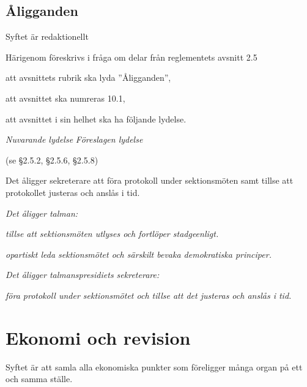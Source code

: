 \documentclass{article}
\newenvironment{lydelse}
    {\begin{paracol}{2}%
        \emph{Nuvarande lydelse}%
        \switchcolumn%
        \emph{Föreslagen lydelse}%
    \end{paracol}%
    \begin{enumerate}[label=\thesubsection.\arabic*]%
    \begin{paracol}{2}%
    }{\end{paracol}\end{enumerate}}
\begin{document}
\subsection{Åligganden}
Syftet är redaktionellt

Härigenom föreskrivs i fråga om delar från reglementets avsnitt 2.5

\begin{dels}
    \item att avsnittets rubrik ska lyda ''Åligganden'',
    \item att avsnittet ska numreras 10.1,
    \item att avsnittet i sin helhet ska ha följande lydelse.
\end{dels}

\begin{lydelse}
    \setcounter{section}{2}
    \setcounter{subsection}{5}
    
    \item[] (se \S2.5.2, \S2.5.6, \S2.5.8)
    
    \vspace{14.3ex}\setcounter{enumi}{3}
    \item Det åligger sekreterare att föra protokoll under sektionsmöten samt tillse att protokollet justeras och anslås i tid. 
    
    \setcounter{section}{10}
    \setcounter{subsection}{1}
    \switchcolumn
    
   \item \emph{Det åligger talman:}
    \begin{aligganden}
        \item \emph{tillse att sektionsmöten utlyses och fortlöper stadgeenligt.}
        \item \emph{opartiskt leda sektionsmötet och särskilt bevaka demokratiska principer.}
    \end{aligganden}
    
   \item \emph{Det åligger talmanspresidiets sekreterare:}
    \begin{aligganden}
        \item \emph{föra protokoll under sektionsmötet och tillse att det justeras och anslås i tid.}
    \end{aligganden}

\end{lydelse}

\section{Ekonomi och revision}
Syftet är att samla alla ekonomiska punkter som föreligger många organ på ett och samma ställe.
\end{document}

